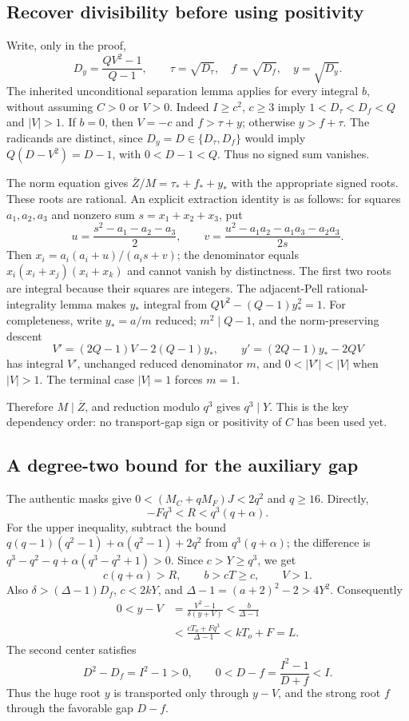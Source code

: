 \documentclass[11pt]{article}
\begin{document}
\subsection{Recover divisibility before using positivity}
Write, only in the proof,
\[
 D_y=\frac{QV^2-1}{Q-1},\qquad
 \tau=\sqrt{D_\tau},\quad f=\sqrt{D_f},\quad y=\sqrt{D_y}.
\]
The inherited unconditional separation lemma applies for every integral
$b$, without assuming $C>0$ or $V>0$.  Indeed $I\ge c^2$, $c\ge3$ imply
$1<D_\tau<D_f<Q$ and $|V|>1$.  If $b=0$, then $V=-c$ and
$f>\tau+y$; otherwise $y>f+\tau$.  The radicands are distinct, since
$D_y=D\in\{D_\tau,D_f\}$ would imply $Q(D-V^2)=D-1$, with
$0<D-1<Q$.  Thus no signed sum vanishes.

The norm equation gives
$\overline Z/M=\tau_*+f_*+y_*$ with the appropriate signed roots.
These roots are rational.  An explicit extraction identity is as follows:
for squares $a_1,a_2,a_3$ and nonzero sum $s=x_1+x_2+x_3$, put
\[
 u=\frac{s^2-a_1-a_2-a_3}{2},\qquad
 v=\frac{u^2-a_1a_2-a_1a_3-a_2a_3}{2s}.
\]
Then $x_i=a_i(a_i+u)/(a_is+v)$; the denominator equals
$x_i(x_i+x_j)(x_i+x_k)$ and cannot vanish by distinctness.
The first two roots are integral because their squares are integers.
The adjacent-Pell rational-integrality lemma makes $y_*$ integral from
$QV^2-(Q-1)y_*^2=1$.  For completeness, write $y_*=a/m$ reduced;
$m^2\mid Q-1$, and the norm-preserving descent
\[
 V'=(2Q-1)V-2(Q-1)y_*,\qquad
 y'=(2Q-1)y_*-2QV
\]
has integral $V'$, unchanged reduced denominator $m$, and
$0<|V'|<|V|$ when $|V|>1$.  The terminal case $|V|=1$ forces $m=1$.

Therefore $M\mid\overline Z$, and reduction modulo $q^3$ gives
$q^3\mid Y$.  This is the key dependency order: no transport-gap sign
or positivity of $C$ has been used yet.

\subsection{A degree-two bound for the auxiliary gap}
The authentic masks give $0<(M_C+qM_F)J<2q^2$ and $q\ge16$.  Directly,
\[
 -Fq^3<R<q^3(q+\alpha).
\]
For the upper inequality, subtract the bound
$q(q-1)(q^2-1)+\alpha(q^2-1)+2q^2$ from $q^3(q+\alpha)$;
the difference is $q^3-q^2-q+\alpha(q^3-q^2+1)>0$.
Since $c>Y\ge q^3$, we get
\[
 c(q+\alpha)>R,\qquad b>cT\ge c,\qquad V>1.
\]
Also $\delta>(\Delta-1)D_f$, $c<2kY$, and
$\Delta-1=(a+2)^2-2>4Y^2$.  Consequently
\begin{align*}
 0<y-V
 &=\frac{V^2-1}{\delta(y+V)}
 <\frac{b}{\Delta-1}\\
 &<\frac{cT_o+Fq^3}{\Delta-1}<kT_o+F=L.
\end{align*}
The second center satisfies
\[
 D^2-D_f=I^2-1>0,\qquad 0<D-f=\frac{I^2-1}{D+f}<I.
\]
Thus the huge root $y$ is transported only through $y-V$, and the strong
root $f$ through the favorable gap $D-f$.
\end{document}
